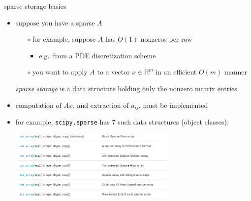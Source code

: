 \documentclass[10pt,
               svgnames,
               hyperref={colorlinks,citecolor=DeepPink4,linkcolor=FireBrick,urlcolor=Maroon},
               usepdftitle=false]{beamer}
\newcommand{\RR}{\mathbb{R}}
\begin{document}
\begin{frame}{sparse storage basics}

\begin{itemize}
\item suppose you have a sparse $A$
   \begin{itemize}
   \item[$\circ$] for example, suppose $A$ has $O(1)$ nonzeros per row
       \begin{itemize}
       \item e.g.~from a PDE discretization scheme
       \end{itemize}
   \item[$\circ$] you want to apply $A$ to a vector $x\in\RR^m$ in an efficient $O(m)$ manner
   \end{itemize}

\begin{definition}
\emph{sparse storage} is a data structure holding only the nonzero matrix entries
\end{definition}   

\item computation of $Ax$, and extraction of $a_{ij}$, must be implemented
\item for example, \texttt{scipy.sparse} has 7 such data structures (object classes):

\medskip
\begin{center}
\includegraphics[width=0.65\textwidth]{images/scipysparse.png}
\end{center}
\end{itemize}
\end{frame}
\end{document}
